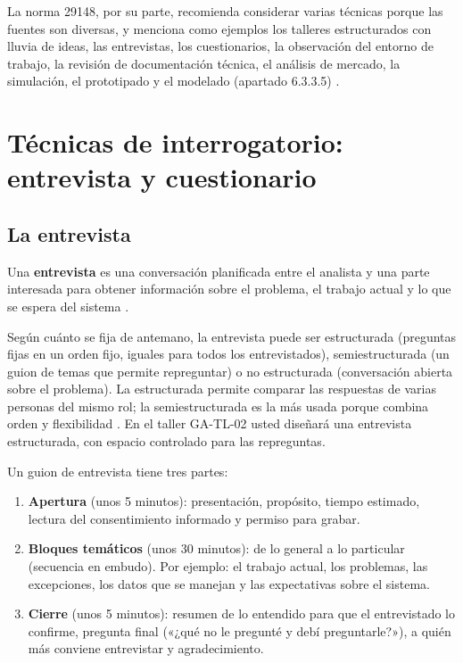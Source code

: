 \documentclass[11pt,a4paper,oneside]{report}
\begin{document}
La norma 29148, por su parte, recomienda considerar varias técnicas porque las fuentes son diversas, y menciona como ejemplos los talleres estructurados con lluvia de ideas, las entrevistas, los cuestionarios, la observación del entorno de trabajo, la revisión de documentación técnica, el análisis de mercado, la simulación, el prototipado y el modelado (apartado 6.3.3.5) \citep{iso29148_2018}.

\section{Técnicas de interrogatorio: entrevista y cuestionario}

\subsection{La entrevista}

\begin{definicion}
	Una \textbf{entrevista} es una conversación planificada entre el analista y una parte interesada para obtener información sobre el problema, el trabajo actual y lo que se espera del sistema \citep{wiegers_beatty_2013,zowghi_coulin_2005}.
\end{definicion}

Según cuánto se fija de antemano, la entrevista puede ser estructurada (preguntas fijas en un orden fijo, iguales para todos los entrevistados), semiestructurada (un guion de temas que permite repreguntar) o no estructurada (conversación abierta sobre el problema). La estructurada permite comparar las respuestas de varias personas del mismo rol; la semiestructurada es la más usada porque combina orden y flexibilidad \citep{zowghi_coulin_2005,wiegers_beatty_2013}. En el taller GA-TL-02 usted diseñará una entrevista estructurada, con espacio controlado para las repreguntas.

\begin{enlapractica}
	Un guion de entrevista tiene tres partes:
	\begin{enumerate}[leftmargin=18pt,itemsep=2pt]
		\item \textbf{Apertura} (unos 5 minutos): presentación, propósito, tiempo estimado, lectura del consentimiento informado y permiso para grabar.
		\item \textbf{Bloques temáticos} (unos 30 minutos): de lo general a lo particular (secuencia en embudo). Por ejemplo: el trabajo actual, los problemas, las excepciones, los datos que se manejan y las expectativas sobre el sistema.
		\item \textbf{Cierre} (unos 5 minutos): resumen de lo entendido para que el entrevistado lo confirme, pregunta final («¿qué no le pregunté y debí preguntarle?»), a quién más conviene entrevistar y agradecimiento.
	\end{enumerate}
\end{enlapractica}
\end{document}
